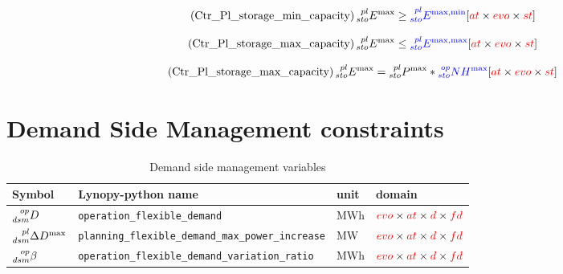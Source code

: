\documentclass{article}
\begin{document}
\begin{equation} \tag{Ctr\_Pl\_storage\_min\_capacity}
   \prescript{pl}{sto}{E^{\max}}  \geq  \textcolor{blue}{\prescript{pl}{sto}{E^{\max,\min}}} \hfill [\textcolor{red}{at} \times \textcolor{red}{evo} \times \textcolor{red}{st}]
\label{eq:Ctr_Pl_storage_min_capacity}
\end{equation}

\begin{equation} \tag{Ctr\_Pl\_storage\_max\_capacity}
   \prescript{pl}{sto}{E^{\max}}  \leq  \textcolor{blue}{\prescript{pl}{sto}{E^{\max,\max}}} \hfill [\textcolor{red}{at} \times \textcolor{red}{evo} \times \textcolor{red}{st}]
\label{eq:Ctr_Pl_storage_min_capacity}
\end{equation}

\begin{equation} \tag{Ctr\_Pl\_storage\_max\_capacity}
  \prescript{pl}{sto}{E^{\max}} = \prescript{pl}{sto}{P^{\max}}  * \textcolor{blue}{\prescript{op}{sto}{NH^{\max}}} \hfill [\textcolor{red}{at} \times \textcolor{red}{evo} \times \textcolor{red}{st}]
\label{eq:Ctr_Pl_storage_min_capacity}
\end{equation}


\newpage

\section{Demand Side Management constraints}

\begin{table}[h]
\footnotesize
  \centering
    \caption{Demand side management  variables}
  \begin{tabular}{llll}
    \hline
    \textbf{Symbol} & \textbf{Lynopy-python name} & \textbf{unit}  & \textbf{domain} \\ \hline
    
    $\prescript{op}{dsm}{D}$ & \verb|operation_flexible_demand| & MWh & $\textcolor{red}{evo} \times \textcolor{red}{at} \times \textcolor{red}{d} \times \textcolor{red}{fd}$ \\ 
    
    $\prescript{pl}{dsm}{\Delta D^{\max}}$ & \verb|planning_flexible_demand_max_power_increase| & MW & $\textcolor{red}{evo} \times \textcolor{red}{at} \times \textcolor{red}{d} \times \textcolor{red}{fd}$ \\ 

    $\prescript{op}{dsm}{\beta}$ & \verb|operation_flexible_demand_variation_ratio| & MWh & $\textcolor{red}{evo} \times \textcolor{red}{at} \times \textcolor{red}{d} \times \textcolor{red}{fd}$ \\ 

  \end{tabular}
\end{table}
\end{document}
